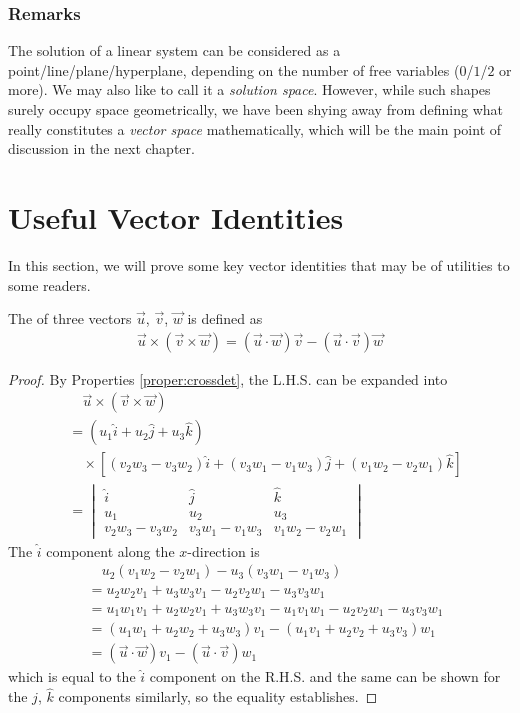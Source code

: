 \subsubsection{Remarks}
The solution of a linear system can be considered as a point/line/plane/hyperplane, depending on the number of free variables ($0$/$1$/$2$ or more). We may also like to call it a \textit{solution space}. However, while such shapes surely occupy space geometrically, we have been shying away from defining what really constitutes a \textit{vector space} mathematically, which will be the main point of discussion in the next chapter.

\section{Useful Vector Identities}
In this section, we will prove some key vector identities that may be of utilities to some readers.
\begin{proper}
\label{proper:triplecross}
The  of three vectors $\vec{u}$, $\vec{v}$, $\vec{w}$ is defined as
\begin{align*}
\vec{u} \times (\vec{v} \times \vec{w}) = (\vec{u} \cdot \vec{w})\vec{v} - (\vec{u} \cdot \vec{v})\vec{w}
\end{align*}
\end{proper}
\begin{proof}
By Properties \ref{proper:crossdet}, the L.H.S. can be expanded into
\begin{align*}
&\quad\vec{u} \times (\vec{v} \times \vec{w}) \\
&= (u_1\hat{i} + u_2\hat{j} + u_3\hat{k}) \\
&\quad \times [(v_2w_3 - v_3w_2)\hat{i} + (v_3w_1 - v_1w_3)\hat{j} + (v_1w_2 - v_2w_1)\hat{k}] \\
&= 
\begin{vmatrix}
\hat{i} & \hat{j} & \hat{k} \\
u_1 & u_2 & u_3 \\
v_2w_3 - v_3w_2 & v_3w_1 - v_1w_3 & v_1w_2 - v_2w_1 
\end{vmatrix}
\end{align*}
The $\hat{i}$ component along the $x$-direction is
\begin{align*}
&\quad u_2(v_1w_2 - v_2w_1) - u_3(v_3w_1 - v_1w_3) \\
&= u_2w_2v_1 + u_3w_3v_1 - u_2v_2w_1 - u_3v_3w_1 \\
&= u_1w_1v_1 + u_2w_2v_1 + u_3w_3v_1 - u_1v_1w_1 - u_2v_2w_1 - u_3v_3w_1 \\
&= (u_1w_1 + u_2w_2 + u_3w_3)v_1 - (u_1v_1 + u_2v_2 + u_3v_3)w_1 \\
&= (\vec{u} \cdot \vec{w})v_1 - (\vec{u} \cdot \vec{v})w_1
\end{align*}
which is equal to the $\hat{i}$ component on the R.H.S. and the same can be shown for the $\hat{j}$, $\hat{k}$ components similarly, so the equality establishes.
\end{proof}

